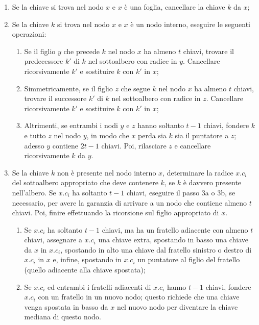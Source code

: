 \begin{enumerate}

\item Se la chiave si trova nel nodo $x$ e $x$ è una foglia, cancellare la chiave $k$ da $x$;
\item Se la chiave $k$ si trova nel nodo $x$ e $x$ è un nodo interno, eseguire le seguenti operazioni:
	\begin{enumerate}
	\item Se il figlio $y$ che precede $k$ nel nodo $x$ ha almeno $t$ chiavi, trovare il predecessore $k'$ di $k$ nel sottoalbero con radice in $y$. Cancellare ricorsivamente $k'$ e sostituire $k$ con $k'$ in $x$;
	\item Simmetricamente, se il figlio $z$ che segue $k$ nel nodo $x$ ha almeno $t$ chiavi, trovare il successore $k'$ di $k$ nel sottoalbero con radice in $z$. Cancellare ricorsivamente $k'$ e sostituire $k$ con $k'$ in $x$;
	\item Altrimenti, se entrambi i nodi $y$ e $z$ hanno soltanto $t-1$ chiavi, fondere $k$ e tutto $z$ nel nodo $y$, in modo che $x$ perda sia $k$ sia il puntatore a $z$; adesso $y$ contiene $2t-1$ chiavi. Poi, rilasciare $z$ e cancellare ricorsivamente $k$ da $y$.
	\end{enumerate}
\item Se la chiave $k$  non è presente nel nodo interno $x$, determinare la radice $x.c_i$ del sottoalbero appropriato che deve contenere $k$, se $k$ è davvero presente nell'albero. Se $x.c_i$ ha soltanto $t-1$ chiavi, eseguire il passo 3a o 3b, se necessario, per avere la garanzia di arrivare a un nodo che contiene almeno $t$ chiavi. Poi, finire effettuando la ricorsione sul figlio appropriato di $x$.
	\begin{enumerate}
	\item Se $x.c_i$ ha soltanto $t-1$ chiavi, ma ha un fratello adiacente con almeno $t$ chiavi, assegnare a $x.c_i$ una chiave extra, spostando in basso una chiave da $x$ in $x.c_i$, spostando in alto una chiave dal fratello sinistro o destro di $x.c_i$ in $x$ e, infine, spostando in $x.c_i$ un puntatore al figlio del fratello (quello adiacente alla chiave spostata);
	\item Se $x.c_i$ ed entrambi i fratelli adiacenti di $x.c_i$ hanno $t-1$ chiavi, fondere $x.c_i$ con un fratello in un nuovo nodo; questo richiede che una chiave venga spostata in basso da $x$ nel nuovo nodo per diventare la chiave mediana di questo nodo.
	\end{enumerate}
\end{enumerate}